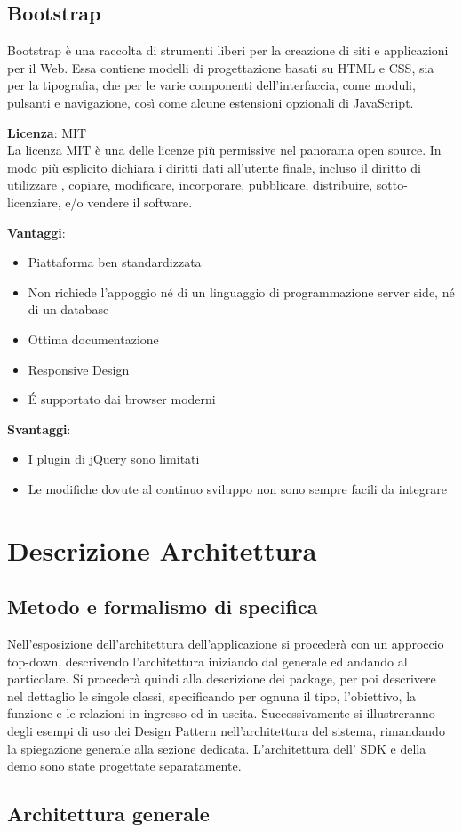 \subsection{Bootstrap}

Bootstrap è una raccolta di strumenti liberi per la creazione di siti e applicazioni per il Web. Essa contiene modelli di progettazione basati su HTML e CSS, sia per la tipografia, che per le varie componenti dell'interfaccia, come moduli, pulsanti e navigazione, così come alcune estensioni opzionali di JavaScript.

\textbf{Licenza}: MIT \\
La licenza MIT è una delle licenze più permissive nel panorama open source. In modo più esplicito dichiara i diritti dati all'utente finale, incluso il diritto di utilizzare , copiare, modificare, incorporare, pubblicare, distribuire, sotto-licenziare, e/o vendere il software.

\textbf{Vantaggi}: 
\begin{itemize}
	
	\item Piattaforma ben standardizzata 
	\item Non richiede l’appoggio né di un linguaggio di programmazione server side, né di un database
	\item Ottima documentazione
	\item Responsive Design	
	\item \'E supportato dai browser moderni
	
\end{itemize}

\textbf{Svantaggi}: 
\begin{itemize}
	\item I plugin di jQuery sono limitati
	\item Le modifiche dovute al continuo sviluppo non sono sempre facili da integrare
\end{itemize}


\section{Descrizione Architettura}
\subsection{Metodo e formalismo di specifica}

Nell’esposizione dell’architettura dell’applicazione si procederà con un approccio top-down, descrivendo l’architettura iniziando dal generale ed andando al particolare.
Si procederà quindi alla descrizione dei package, per poi descrivere
nel dettaglio le singole classi, specificando per ognuna il tipo, l’obiettivo, la funzione e
le relazioni in ingresso ed in uscita.
Successivamente si illustreranno degli esempi di uso dei Design Pattern nell’architettura del sistema, rimandando la spiegazione generale alla sezione dedicata.
L'architettura dell' SDK e della demo sono state progettate separatamente.  

 
\subsection{Architettura generale}


